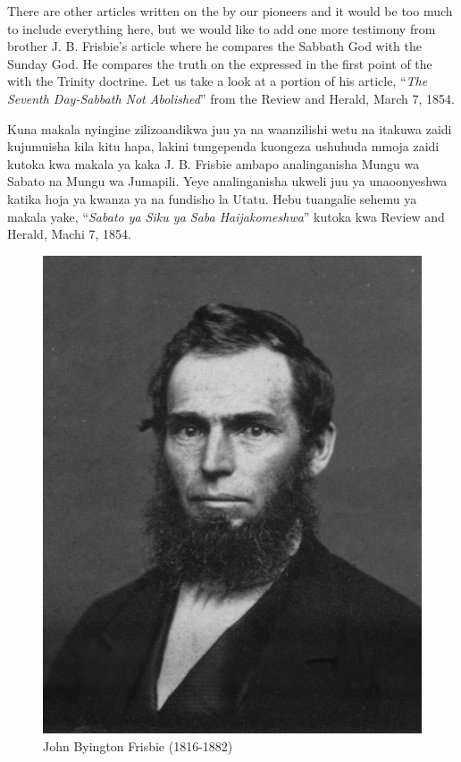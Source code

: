 



There are other articles written on the  by our pioneers and it would be too much to include everything here, but we would like to add one more testimony from brother J. B. Frisbie’s article where he compares the Sabbath God with the Sunday God. He compares the truth on the  expressed in the first point of the  with the Trinity doctrine. Let us take a look at a portion of his article, “\textit{The Seventh Day-Sabbath Not Abolished}” from the Review and Herald, March 7, 1854.


Kuna makala nyingine zilizoandikwa juu ya  na waanzilishi wetu na itakuwa zaidi kujumuisha kila kitu hapa, lakini tungependa kuongeza ushuhuda mmoja zaidi kutoka kwa makala ya kaka J. B. Frisbie ambapo analinganisha Mungu wa Sabato na Mungu wa Jumapili. Yeye analinganisha ukweli juu ya  unaoonyeshwa katika hoja ya kwanza ya  na fundisho la Utatu. Hebu tuangalie sehemu ya makala yake, “\textit{Sabato ya Siku ya Saba Haijakomeshwa}” kutoka kwa Review and Herald, Machi 7, 1854.


\begin{figure}[hp]
    \centering
    \includegraphics[width=1\linewidth]{images/j-b-frisbie.jpg}
    \caption*{John Byington Frisbie (1816-1882)}
    \label{fig:j-b-frisbie}
\end{figure}


